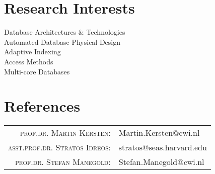 \documentclass[a4paper,10pt]{article}
\begin{document}
\section{Research Interests}
Database Architectures $\&$ Technologies\\
Automated Database Physical Design\\
Adaptive Indexing\\
Access Methods\\
Multi-core Databases\\


\section{References}
\begin{tabular}{rl}
\textsc{prof.dr. Martin  Kersten}:& Martin.Kersten@cwi.nl\\
\textsc{asst.prof.dr. Stratos Idreos}:& stratos@seas.harvard.edu\\
\textsc{prof.dr. Stefan Manegold}:& Stefan.Manegold@cwi.nl\\
\end{tabular}


\end{document}
